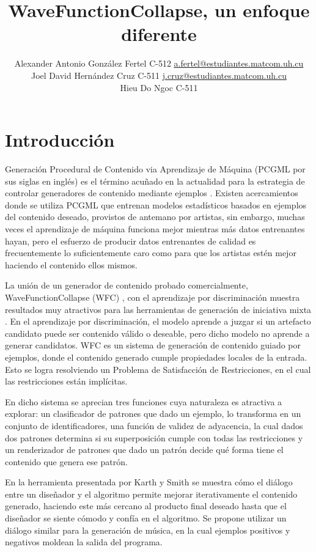 \documentclass[a4paper, 10pt]{article}
\title{WaveFunctionCollapse, un enfoque diferente}
\author{Alexander Antonio González Fertel C-512 \hfill
		\href{mailto:a.fertel@estudiantes.matcom.uh.cu}{a.fertel@estudiantes.matcom.uh.cu}\\
		Joel David Hernández Cruz C-511 \hfill
		\href{mailto:j.cruz@estudiantes.matcom.uh.cu}{j.cruz@estudiantes.matcom.uh.cu}\\
		Hieu Do Ngoc C-511 \hfill}
\date{}
\begin{document}
	\maketitle

	\section{Introducción}
	Generación Procedural de Contenido via Aprendizaje de Máquina (PCGML por sus siglas en inglés)
	es el término acuñado en la actualidad para la estrategia de controlar
	generadores de contenido mediante ejemplos \cite{bib:1}. Existen acercamientos
	donde se utiliza PCGML que entrenan modelos estadísticos basados en ejemplos
	del contenido deseado, provistos de antemano por artistas, sin embargo,
	muchas veces el aprendizaje de máquina funciona mejor mientras más
	datos entrenantes hayan, pero el esfuerzo de producir datos entrenantes
	de calidad es frecuentemente lo suficientemente caro como para
	que los artistas estén mejor haciendo el contenido ellos mismos.
	
	La unión de un generador de contenido probado comercialmente,
	WaveFunctionCollapse (WFC) \cite{bib:2}, con el aprendizaje por discriminación
	muestra resultados muy atractivos \cite{bib:3} para las herramientas
	de generación de iniciativa mixta \cite{bib:4}. En el aprendizaje por 
	discriminación, el modelo aprende a juzgar si un artefacto candidato
	puede ser contenido válido o deseable, pero dicho modelo no aprende
	a generar candidatos. WFC es un sistema de generación de contenido
	guiado por ejemplos, donde el contenido generado cumple propiedades
	locales de la entrada. Esto se logra resolviendo un Problema de Satisfacción
	de Restricciones, en el cual las restricciones están implícitas. 
	
	En dicho sistema se aprecian tres funciones
	cuya naturaleza es atractiva a explorar: un clasificador de patrones 
	que dado un ejemplo, lo transforma en un conjunto de identificadores,
	una función de validez de adyacencia, la cual dados dos patrones determina
	si su superposición cumple con todas las restricciones y un 
	renderizador de patrones que dado un patrón decide qué forma tiene
	el contenido que genera ese patrón.
	
	En la herramienta presentada por Karth y Smith \cite{bib:3} se muestra
	cómo el diálogo entre un diseñador y el algoritmo permite mejorar iterativamente
	el contenido generado, haciendo este más cercano al producto final
	deseado hasta que el diseñador se siente cómodo y confía en el algoritmo.
	Se propone utilizar un diálogo similar para la generación de música,
	en la cual ejemplos positivos y negativos moldean la salida del programa.
\end{document}
